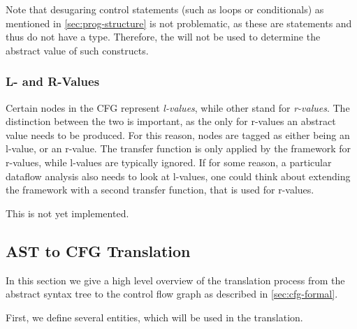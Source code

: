 Note that desugaring control statements (such as loops or conditionals) as mentioned
in \autoref{sec:prog-structure} is not problematic, as these are statements and thus do not
have a type.  Therefore, the  will not be used to determine
the abstract value of such constructs.




\subsubsection{L- and R-Values}

Certain nodes in the CFG represent \emph{l-values}, while other stand for \emph{r-values}.  The
distinction between the two is important, as the only for r-values an abstract value needs to be
produced.  For this reason, nodes are tagged as either being an l-value, or an r-value.  The transfer function
is only applied by the framework for r-values, while l-values are typically ignored.  If for some
reason, a particular dataflow analysis also needs to look at l-values, one could think about
extending the framework with a second transfer function, that is used for r-values.

\begin{workinprogress}
    This is not yet implemented.
\end{workinprogress}





\subsection{AST to CFG Translation}

In this section we give a high level overview of the translation process from the
abstract syntax tree to the control flow graph as described in \autoref{sec:cfg-formal}.

First, we define several entities, which will be used in the translation.


